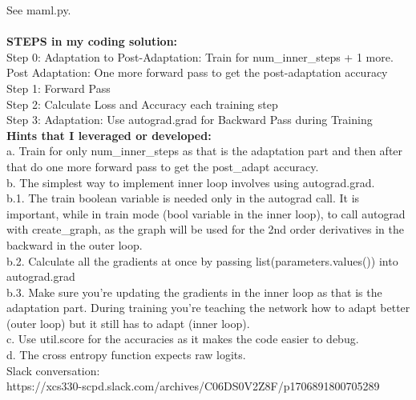 \begin{answer}

    See maml.py.
    \\
    \\
    \textbf{STEPS in my coding solution:}
    \\
    Step 0: Adaptation to Post-Adaptation: Train for num\_inner\_steps + 1 more.
    \\
    Post Adaptation: One more forward pass to get the post-adaptation accuracy
    \\
    Step 1: Forward Pass
    \\
    Step 2: Calculate Loss and Accuracy each training step
    \\
    Step 3: Adaptation: Use autograd.grad for Backward Pass during Training
    \\

    \textbf{Hints that I leveraged or developed:}
    \\
    a. Train for only num\_inner\_steps as that is the adaptation part and then after that do one more forward pass to get the post\_adapt accuracy.
    \\
    b. The simplest way to implement inner loop involves using autograd.grad.
    \\
        b.1. The train boolean variable is needed only in the autograd call. 
             It is important, while in train mode (bool variable in the inner loop), to call autograd with create\_graph, as the graph will be used for the 2nd order derivatives in the backward in the outer loop.
    \\
        b.2. Calculate all the gradients at once by passing list(parameters.values()) into autograd.grad
    \\
        b.3. Make sure you’re updating the gradients in the inner loop as that is the adaptation part. During training you’re teaching the network how to adapt better (outer loop) but it still has to adapt (inner loop).
    \\
    c. Use util.score for the accuracies as it makes the code easier to debug.
    \\
    d. The cross entropy function expects raw logits.
    \\

    Slack conversation: 
    \\
    https://xcs330-scpd.slack.com/archives/C06DS0V2Z8F/p1706891800705289
    \\
    \\


\end{answer}

